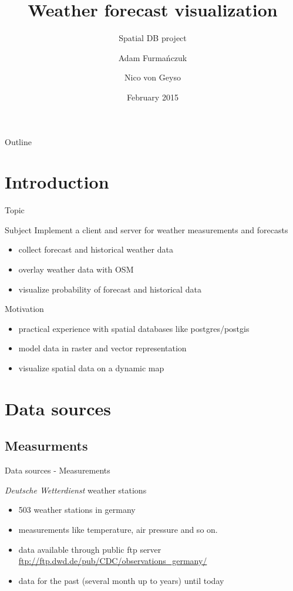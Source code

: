 \documentclass[ucs,9pt]{beamer}
\title[Spatial DB Project] %
{Weather forecast visualization}
\subtitle
{Spatial DB project}
\author[Author, Another] %
{Adam Furmańczuk \and Nico von Geyso}
\institute[FU Berlin] %
{Freie Universität Berlin}
\date[2015] %
{February 2015}
\begin{document}
\begin{frame}[plain]
  \titlepage
\end{frame}

\begin{frame}{Outline}
  \tableofcontents
\end{frame}

\section{Introduction}

\begin{frame}{Topic}
  \begin{block}{Subject}
    Implement a client and server for weather measurements and forecasts
    \begin{itemize}
	    \item collect forecast and historical weather data
	    \item overlay weather data with OSM
	    \item visualize probability of forecast and historical data
	\end{itemize}
  \end{block}

  \begin{block}{Motivation}
    \begin{itemize}
      \item practical experience with spatial databases like postgres/postgis
      \item model data in raster and vector representation
      \item visualize spatial data on a dynamic map
    \end{itemize}
  \end{block}
\end{frame}

\section{Data sources}
\subsection{Measurments}
\begin{frame}{Data sources - Measurements}
  \begin{block}{\textit{Deutsche Wetterdienst} weather stations}
    \begin{itemize}
        \item 503 weather stations in germany
        \item measurements like temperature, air pressure and so on.
        \item data available through public ftp server \\
          \vspace{0.1cm}
          \url{ftp://ftp.dwd.de/pub/CDC/observations_germany/}
        \item data for the past (several month up to years) until today
    \end{itemize}
  \end{block}
\end{frame}
\end{document}
